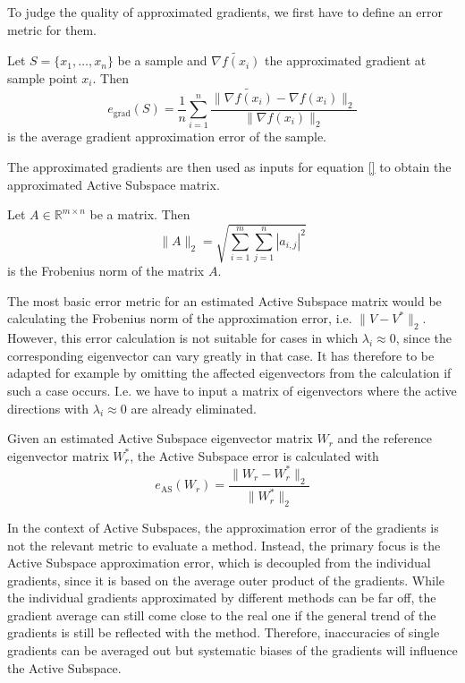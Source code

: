\documentclass[
  a4paper,  %
  twoside,  %
  bibliography=totoc,
  headsepline,
  cleardoublepage=empty,
  parskip=half,
  draft=false
]{scrbook}
\begin{document}
To judge the quality of approximated gradients, we first have to define an error metric for them.

\begin{definition}
Let $S=\{x_1, \dots, x_n\}$ be a sample and $\widetilde{\nabla f(x_i)}$ the approximated gradient at sample point $x_i$. Then
\begin{equation}
e_{\text{grad}}(S)=\frac{1}{n} \sum_{i=1}^n \frac{\| \widetilde{\nabla f(x_i)} - \nabla f(x_i) \|_2}{\| \nabla f(x_i) \|_2}
\nonumber
\end{equation}
is the average gradient approximation error of the sample.
\end{definition}

The approximated gradients are then used as inputs for equation \ref{} to obtain the approximated Active Subspace matrix.

\begin{definition}
Let $A \in \mathds{R}^{m \times n}$ be a matrix. Then
\begin{equation}
\| A\|_2=\sqrt{\sum_{i=1}^m \sum_{j=1}^n |a_{i,j}|^2}
\nonumber
\end{equation}
is the Frobenius norm of the matrix $A$.
\end{definition}

The most basic error metric for an estimated Active Subspace matrix would be calculating the Frobenius norm of the approximation error, i.e. $\| V - V^* \|_2$.
However, this error calculation is not suitable for cases in which $\lambda_i \approx 0$, since the corresponding eigenvector can vary greatly in that case.
It has therefore to be adapted for example by omitting the affected eigenvectors from the calculation if such a case occurs.
I.e. we have to input a matrix of eigenvectors where the active directions with $\lambda_i \approx 0$ are already eliminated.

\begin{definition}
Given an estimated Active Subspace eigenvector matrix $W_r$ and the reference eigenvector matrix $W_r^*$, the
Active Subspace error is calculated with
\begin{equation}
e_{\text{AS}}(W_r)=\frac{\| W_r - W_r^* \|_2}{\| W_r^* \|_2}
\nonumber
\end{equation}
\end{definition}

In the context of Active Subspaces, the approximation error of the gradients is not the relevant metric to evaluate a method.
Instead, the primary focus is the Active Subspace approximation error, which is decoupled from the individual gradients, since it is based on the average outer product of the gradients.
While the individual gradients approximated by different methods can be far off, the gradient average can still come close to the real one if the general trend of the gradients is still be reflected with the method.
Therefore, inaccuracies of single gradients can be averaged out but systematic biases of the gradients will influence the Active Subspace.
\end{document}
